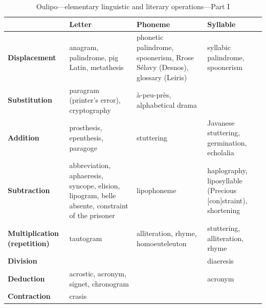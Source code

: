 \begin{table}[!htbp]
\caption[Oulipo operations I]{Oulipo---elementary linguistic and literary operations---Part I}
\label{tab:oulipo1}
{\footnotesize
\begin{tabu}{X[l,0.7]X[l]X[l]X[l]}
  \toprule
  & \textbf{Letter}
  & \textbf{Phoneme}
  & \textbf{Syllable}
  \\ \midrule
  \textbf{Displacement} 
  & anagram, palindrome, pig Latin, metathesis 
  & phonetic palindrome, spoonerism, Rrose S{\'e}lavy (Desnos), glossary (Leiris)
  & syllabic palindrome, spoonerism
  \\
  \textbf{Substitution} 
  & paragram (printer's error), cryptography
  & {\`a}-peu-pr{\`e}s, alphabetical drama
  &
  \\
  \textbf{Addition} 
  & prosthesis, epenthesis, paragoge
  & stuttering
  & Javanese stuttering, germination, echolalia 
  \\
  \textbf{Subtraction} 
  & abbreviation, aphaeresis, syncope, elision, lipogram, belle absente, constraint of the prisoner
  & lipophoneme
  & haplography, liposyllable (Precious [con]straint), shortening
  \\
  \textbf{Multiplication (repetition)} 
  & tautogram
  & alliteration, rhyme, homoeuteleuton
  & stuttering, alliteration, rhyme
  \\
  \textbf{Division} 
  &
  &
  & diaeresis
  \\
  \textbf{Deduction} 
  & acrostic, acronym, signet, chronogram
  & 
  & acronym
  \\
  \textbf{Contraction}
  & crasis
  &
  & 
  \\
  \bottomrule
\end{tabu}
}
\end{table}

